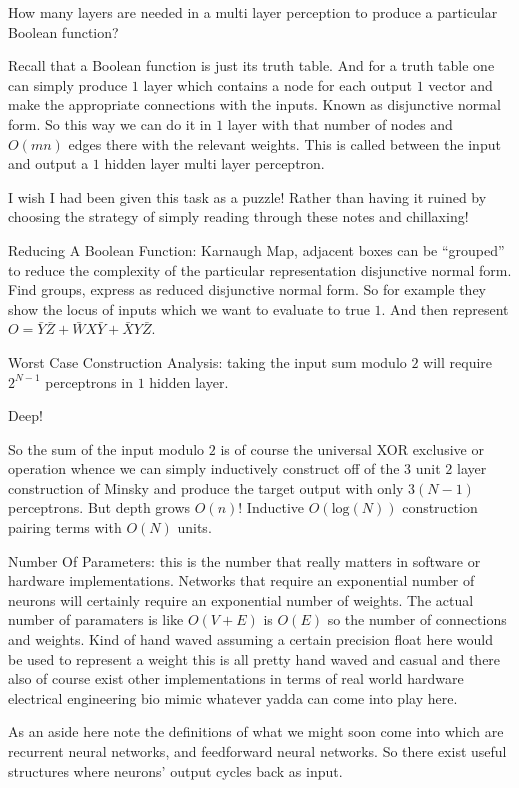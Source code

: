 How many layers are needed in a multi layer perception to produce a particular Boolean function?

Recall that a Boolean function is just its truth table. And for a truth table one can simply produce $1$ layer which contains a node for each output $1$ vector and make the appropriate connections with the inputs. Known as disjunctive normal form. So this way we can do it in $1$ layer with that number of nodes and $O(mn)$ edges there with the relevant weights. This is called between the input and output a $1$ hidden layer multi layer perceptron.

I wish I had been given this task as a puzzle! Rather than having it ruined by choosing the strategy of simply reading through these notes and chillaxing!

Reducing A Boolean Function: Karnaugh Map, adjacent boxes can be ``grouped'' to reduce the complexity of the particular representation disjunctive normal form. Find groups, express as reduced disjunctive normal form. So for example they show the locus of inputs which we want to evaluate to true $1$. And then represent $O = \bar{Y} \bar{Z} + \bar{W} X \bar{Y} + \bar{X} Y \bar{Z}$.

Worst Case Construction Analysis: taking the input sum modulo $2$ will require $2^{N-1}$ perceptrons in $1$ hidden layer.

Deep!

So the sum of the input modulo $2$ is of course the universal XOR exclusive or operation whence we can simply inductively construct off of the $3$ unit $2$ layer construction of Minsky and produce the target output with only $3(N-1)$ perceptrons. But depth grows $O(n)$! Inductive $O(\text{log}(N))$ construction pairing terms with $O(N)$ units.

Number Of Parameters: this is the number that really matters in software or hardware implementations. Networks that require an exponential number of neurons will certainly require an exponential number of weights. The actual number of paramaters is like $O(V+E)$ is $O(E)$ so the number of connections and weights. Kind of hand waved assuming a certain precision float here would be used to represent a weight this is all pretty hand waved and casual and there also of course exist other implementations in terms of real world hardware electrical engineering bio mimic whatever yadda can come into play here.

As an aside here note the definitions of what we might soon come into which are recurrent neural networks, and feedforward neural networks. So there exist useful structures where neurons' output cycles back as input.

